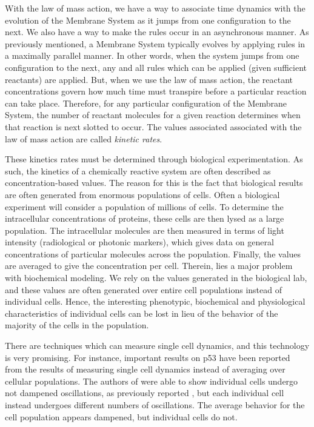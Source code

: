 \documentclass[copyright]{eptcs}
\begin{document}
With the law of mass action, we have a way to associate time dynamics with the evolution of the Membrane System as it jumps from one configuration to the next.  We also have a way to make the rules occur in an asynchronous manner.  As previously mentioned, a Membrane System typically evolves by applying rules in a maximally parallel manner.  In other words, when the system jumps from one configuration to the next, any and all rules which can be applied (given sufficient reactants) are applied.  But, when we use the law of mass action, the reactant concentrations govern how much time must transpire before a particular reaction can take place.  Therefore, for any particular configuration of the Membrane System, the number of reactant molecules for a given reaction determines when that reaction is next slotted to occur.  The values associated associated with the law of mass action are called \emph{kinetic rates}.

These kinetics rates must be determined through biological experimentation.  As such, the kinetics of a chemically reactive system are often described as concentration-based values.  The reason for this is the fact that biological results are often generated from enormous populations of cells.  Often a biological experiment will consider a population of millions of cells.  To determine the intracellular concentrations of proteins, these cells are then lysed as a large population.  The intracellular molecules are then measured in terms of light intensity (radiological or photonic markers), which gives data on general concentrations of particular molecules across the population.  Finally, the values are averaged to give the concentration per cell.  Therein, lies a major problem with biochemical modeling.  We rely on the values generated in the biological lab, and these values are often generated over entire cell populations instead of individual cells.  Hence, the interesting phenotypic, biochemical and physiological characteristics of individual cells can be lost in lieu of the behavior of the majority of the cells in the population.

There are techniques which can measure single cell dynamics, and this technology is very promising.  For instance, important results on p53 have been reported~\cite{lahav04} from the results of measuring single cell dynamics instead of averaging over cellular populations.  The authors of \cite{lahav04} were able to show individual cells undergo not dampened oscillations, as previously reported \cite{baror00}, but each individual cell instead undergoes different numbers of oscillations.  The average behavior for the cell population appears dampened, but individual cells do not.
\end{document}
